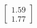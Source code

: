 \documentclass[preview]{standalone}
\begin{document}
\begin{align*}
\begin{bmatrix} 1.59 \\ 1.77 \end{bmatrix}
\end{align*}
\end{document}
